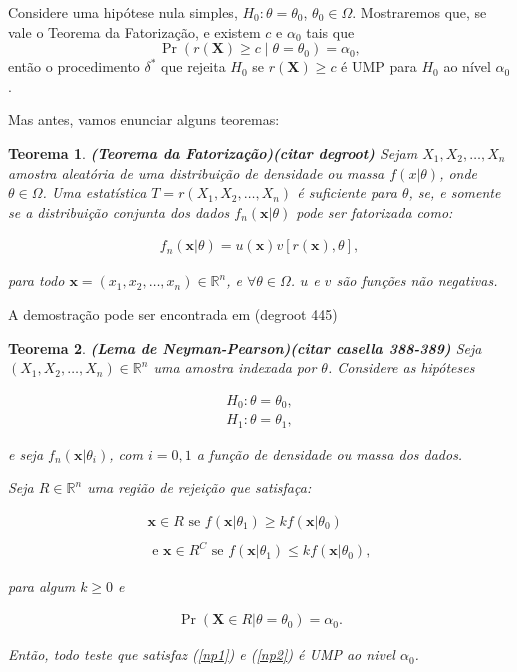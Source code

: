 \documentclass[a4paper,10pt, notitlepage]{report}
\newtheorem{teo}{Teorema}
\newcommand{\pr}{\operatorname{Pr}} %
\newcommand{\rs}{X_1, X_2, \ldots, X_n} %
\newcommand{\rsd}{x_1, x_2, \ldots, x_n} %
\newcommand{\bX}{\boldsymbol{X}} %
\newcommand{\bx}{\boldsymbol{x}} %
\begin{document}
	Considere uma hipótese nula simples, $H_0: \theta = \theta_0$, $\theta_0 \in \Omega$.
	Mostraremos que, se vale o Teorema da Fatorização, e existem $c$ e $\alpha_0$ tais que
	\begin{equation}
	\pr\left(r(\bX) \geq c \mid \theta = \theta_0\right) = \alpha_0\nonumber,
	\end{equation}
	então o procedimento $\delta^\ast$ que rejeita $H_0$ se $r(\bX) \geq c$ é UMP para $H_0$ ao nível $\alpha_0$.
	
	Mas antes, vamos enunciar alguns teoremas:
	
	\begin{teo}
		\textbf{(Teorema da Fatorização)(citar degroot)}
		Sejam $\rs$ amostra aleatória de uma distribuição de densidade ou massa $f(x|\theta)$, onde $\theta\in\Omega$. Uma estatística $T=r(\rs)$ é suficiente para $\theta$, se, e somente se a distribuição conjunta dos dados $f_n(\bx|\theta)$ pode ser fatorizada como:
		
		\begin{align*}
			f_n(\bx|\theta) = u(\bx)v[r(\bx),\theta],
		\end{align*}
		
		para todo $\bx= (\rsd)\in\mathbb{R}^n$, e $\forall \theta \in \Omega$. $u$ e $v$ são funções não negativas.
		
	\end{teo}

	A demostração pode ser encontrada em (degroot 445)
	
	\begin{teo}
		\textbf{(Lema de Neyman-Pearson)(citar casella 388-389)} Seja $(\rs)\in\mathbb{R}^n$ uma amostra indexada por $\theta$. Considere as hipóteses
		
		\begin{align}
		\label{hnp}
		H_0:\theta=\theta_0,\\
		H_1:\theta=\theta_1,\nonumber
		\end{align}
		
		e seja $f_n(\bx|\theta_i)$, com $i=0,1$ a função de densidade ou massa dos dados.
		
		Seja $R\in\mathbb{R}^n$ uma região de rejeição que satisfaça:
		
		\begin{align}
		\label{np1}
			\bx\in R\text{ se } f(\bx|\theta_1)\geq kf(\bx|\theta_0)\nonumber\\ \\\text{ e }\bx\in R^C\text{ se } f(\bx|\theta_1)\leq k f(\bx|\theta_0),\nonumber
		\end{align}
		
		para algum $k\geq0$ e 
		
		\begin{align}
		\label{np2}
			\pr(\bX\in R|\theta = \theta_0)=\alpha_0.
		\end{align}
		
		Então, todo teste que satisfaz (\ref{np1}) e (\ref{np2}) é UMP ao nivel $\alpha_0$.
	\end{teo}
\end{document}
